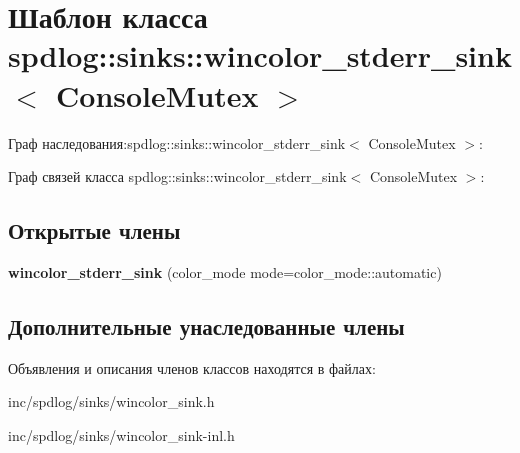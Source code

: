 \hypertarget{classspdlog_1_1sinks_1_1wincolor__stderr__sink}{}\section{Шаблон класса spdlog\+:\+:sinks\+:\+:wincolor\+\_\+stderr\+\_\+sink$<$ Console\+Mutex $>$}
\label{classspdlog_1_1sinks_1_1wincolor__stderr__sink}


Граф наследования\+:spdlog\+:\+:sinks\+:\+:wincolor\+\_\+stderr\+\_\+sink$<$ Console\+Mutex $>$\+:


Граф связей класса spdlog\+:\+:sinks\+:\+:wincolor\+\_\+stderr\+\_\+sink$<$ Console\+Mutex $>$\+:
\subsection*{Открытые члены}
\begin{DoxyCompactItemize}
\item 
\mbox{\label{classspdlog_1_1sinks_1_1wincolor__stderr__sink_a38e38fa6194a04a82843ec5132adb026}} 
{\bfseries wincolor\+\_\+stderr\+\_\+sink} (color\+\_\+mode mode=color\+\_\+mode\+::automatic)
\end{DoxyCompactItemize}
\subsection*{Дополнительные унаследованные члены}


Объявления и описания членов классов находятся в файлах\+:\begin{DoxyCompactItemize}
\item 
inc/spdlog/sinks/wincolor\+\_\+sink.\+h\item 
inc/spdlog/sinks/wincolor\+\_\+sink-\/inl.\+h\end{DoxyCompactItemize}

